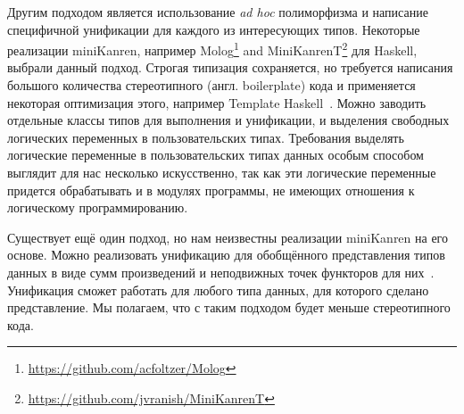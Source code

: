 Другим подходом является использование \emph{ad hoc} полиморфизма и написание специфичной унификации для каждого из интересующих типов.
Некоторые реализации miniKanren, например  Molog\footnote{\url{https://github.com/acfoltzer/Molog}} and
MiniKanrenT\footnote{\url{https://github.com/jvranish/MiniKanrenT}} для Haskell, выбрали данный подход.
Строгая типизация сохраняется, но требуется написания большого количества стереотипного (англ. boilerplate) кода и применяется некоторая оптимизация этого, например
Template Haskell~\cite{SheardTMH}.
Можно заводить~\cite{TypedLogicalVariables} отдельные классы типов для выполнения и унификации, и выделения свободных логических переменных в пользовательских типах.
Требования выделять логические переменные в пользовательских типах данных особым способом выглядит для нас несколько искусственно, так как эти логические переменные придется обрабатывать и в модулях программы, не имеющих отношения к логическому программированию.


Существует ещё один подход, но нам неизвестны реализации miniKanren  на его основе.
Можно реализовать унификацию для обобщённого представления типов данных в виде сумм произведений и неподвижных точек функторов для них~\cite{InstantGenerics, ALaCarte}.
Унификация сможет работать для любого типа данных, для которого сделано представление.
Мы полагаем, что с таким подходом будет меньше стереотипного кода.

\def\adhoc{\emph{ad hoc}}

